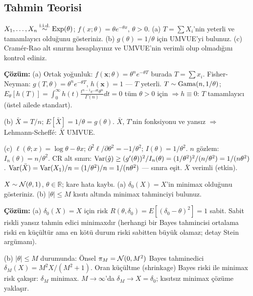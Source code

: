 \subsection{Tahmin Teorisi}

\begin{ornek}
$X_1,\ldots,X_n\overset{\text{i.i.d.}}{\sim}\operatorname{Exp}(\theta)$; $f(x;\theta)=\theta e^{-\theta x}$, $\theta>0$.
(a) $T=\sum X_i$'nin yeterli ve tamamlayıcı olduğunu gösteriniz.
(b) $g(\theta)=1/\theta$ için UMVUE'yi bulunuz.
(c) Cramér-Rao alt sınırını hesaplayınız ve UMVUE'nin verimli olup olmadığını kontrol ediniz.

\textbf{Çözüm:}
(a) Ortak yoğunluk: $f(\mathbf{x};\theta)=\theta^n e^{-\theta T}$ burada $T=\sum x_i$. Fisher-Neyman: $g(T,\theta)=\theta^n e^{-\theta T}$, $h(\mathbf{x})=1$ --- $T$ yeterli.
$T\sim\operatorname{Gama}(n,1/\theta)$; $E_\theta[h(T)]=\int_0^\infty h(t)\frac{t^{n-1}e^{-\theta t}\theta^n}{\Gamma(n)}dt=0$ tüm $\theta>0$ için $\Rightarrow h\equiv0$: $T$ tamamlayıcı (üstel ailede standart).

(b) $\bar X=T/n$; $E[\bar X]=1/\theta=g(\theta)$. $\bar X$, $T$'nin fonksiyonu ve yansız $\Rightarrow$ Lehmann-Scheffé: $\bar X$ UMVUE.

(c) $\ell(\theta;x)=\log\theta-\theta x$; $\partial^2\ell/\partial\theta^2=-1/\theta^2$; $I(\theta)=1/\theta^2$.
$n$ gözlem: $I_n(\theta)=n/\theta^2$. CR alt sınırı: $\operatorname{Var}(\hat g)\geq (g'(\theta))^2/I_n(\theta)=(1/\theta^2)^2/(n/\theta^2)=1/(n\theta^2)$.
$\operatorname{Var}(\bar X)=\operatorname{Var}(X_1)/n=(1/\theta^2)/n=1/(n\theta^2)$ --- sınıra eşit. $\bar X$ verimli (etkin).
\end{ornek}

\begin{ornek}
$X\sim\mathcal{N}(\theta,1)$, $\theta\in\mathbb{R}$; kare hata kaybı.
(a) $\delta_0(X)=X$'in minimax olduğunu gösteriniz.
(b) $|\theta|\leq M$ kısıtı altında minimax tahminciyi bulunuz.

\textbf{Çözüm:}
(a) $\delta_0(X)=X$ için risk $R(\theta,\delta_0)=E[(\delta_0-\theta)^2]=1$ sabit.
Sabit riskli yansız tahmin edici minimaxdır (herhangi bir Bayes tahmincisi ortalama riski en küçültür ama en kötü durum riski sabitten büyük olamaz; detay Stein argümanı).

(b) $|\theta|\leq M$ durumunda: Önsel $\pi_M=\mathcal{N}(0,M^2)$ Bayes tahminedici $\delta_M(X)=M^2X/(M^2+1)$. Oran küçültme (shrinkage) Bayes riski ile minimax risk çakışır: $\delta_M$ minimax.
$M\to\infty$'da $\delta_M\to X=\delta_0$; kısıtsız minimax çözüme yaklaşır.
\end{ornek}

